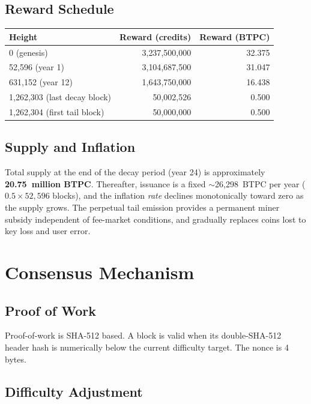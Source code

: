 \documentclass[11pt,a4paper]{article}
\begin{document}
\subsection{Reward Schedule}

\begin{center}
\begin{tabular}{lrr}
\toprule
\textbf{Height} & \textbf{Reward (credits)} & \textbf{Reward (BTPC)} \\
\midrule
0 (genesis) & 3{,}237{,}500{,}000 & 32.375 \\
52{,}596 (year 1) & 3{,}104{,}687{,}500 & 31.047 \\
631{,}152 (year 12) & 1{,}643{,}750{,}000 & 16.438 \\
1{,}262{,}303 (last decay block) & 50{,}002{,}526 & 0.500 \\
1{,}262{,}304 (first tail block) & 50{,}000{,}000 & 0.500 \\
\bottomrule
\end{tabular}
\end{center}

\subsection{Supply and Inflation}

Total supply at the end of the decay period (year 24) is approximately \textbf{20.75~million BTPC}. Thereafter, issuance is a fixed $\sim$26{,}298~BTPC per year ($0.5 \times 52{,}596$ blocks), and the inflation \emph{rate} declines monotonically toward zero as the supply grows. The perpetual tail emission provides a permanent miner subsidy independent of fee-market conditions, and gradually replaces coins lost to key loss and user error.

\section{Consensus Mechanism}

\subsection{Proof of Work}

Proof-of-work is SHA-512 based. A block is valid when its double-SHA-512 header hash is numerically below the current difficulty target. The nonce is 4 bytes.

\subsection{Difficulty Adjustment}
\end{document}
